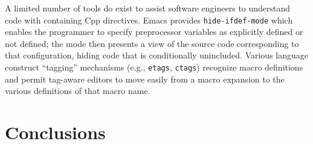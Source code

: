 \documentclass[10pt]{article}
\begin{document}



A limited number of tools do exist to assist software engineers to
understand code with containing Cpp directives.  Emacs provides
\texttt{hide-ifdef-mode} which enables the programmer to specify
preprocessor variables as explicitly defined or not defined; the mode
then presents a view of the source code corresponding to that
configuration, hiding code that is conditionally unincluded.  Various
language construct ``tagging'' mechanisms (e.g., \texttt{etags},
\texttt{ctags}) recognize macro definitions and permit tag-aware editors
to move easily from a macro expansion to the various definitions of
that macro name.


\section{Conclusions}
\label{sec:conclusion}
\end{document}
